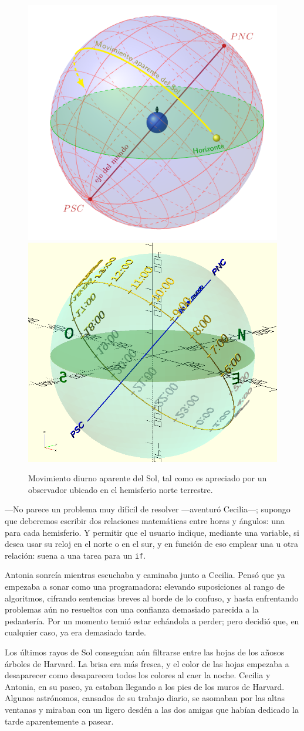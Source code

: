 \begin{figure}[t]
  \centering
  \includegraphics[width=.49\textwidth]{imagenes/movimiento-aparente-solar-hemisferio-norte}\hfill
  \includegraphics[width=.49\textwidth]{imagenes/esfera-celeste-horas-norte}
  \caption{Movimiento diurno aparente del Sol, tal como es apreciado
    por un observador ubicado en el hemisferio norte terrestre.}
  \label{fig:mov-ap-sol-norte}
\end{figure}


---No parece un problema muy difícil de resolver ---a\-ven\-tu\-ró
Cecilia---; supongo que deberemos escribir dos relaciones matemáticas
entre horas y ángulos: una para cada hemisferio. Y permitir que el
usuario indique, mediante una variable, si desea usar su reloj en el
norte o en el sur, y en función de eso emplear una u otra relación:
suena a una tarea para un \lstinline!if!.

Antonia sonreía mientras escuchaba y caminaba junto a Cecilia. Pensó
que ya empezaba a sonar como una programadora: elevando suposiciones
al rango de algoritmos, cifrando sentencias breves al borde de lo
confuso, y hasta enfrentando problemas aún no resueltos con una
confianza demasiado parecida a la pedantería. Por un momento temió
estar echándola a perder; pero decidió que, en cualquier caso, ya era
demasiado tarde.

Los últimos rayos de Sol conseguían aún filtrarse entre las hojas de
los añosos árboles de Harvard. La brisa era más fresca, y el color de
las hojas empezaba a desaparecer como desaparecen todos los colores al
caer la noche. Cecilia y Antonia, en su paseo, ya estaban llegando a
los pies de los muros de Harvard. Algunos astrónomos, cansados de su
trabajo diario, se asomaban por las altas ventanas y miraban con un
ligero desdén a las dos amigas que habían dedicado la tarde
aparentemente a pasear.

